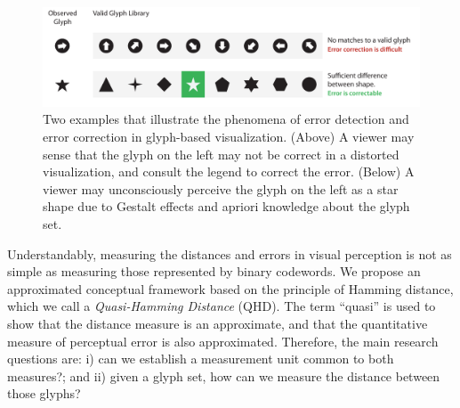 \begin{figure}[t!]
\begin{center}
\includegraphics[width=\textwidth]{images/filesystem/latest/QHD}
\end{center}
\caption{Two examples that illustrate the phenomena of error detection and error correction in glyph-based visualization. (Above) A viewer may sense that the glyph on the left may not be correct in a distorted visualization, and consult the legend to correct the error. (Below) A viewer may unconsciously perceive the glyph on the left as a star shape due to Gestalt effects and apriori knowledge about the glyph set.}
\label{fig:glyph_hamming}
\end{figure}


Understandably, measuring the distances and errors in visual perception is not as simple as measuring those represented by binary codewords.
We propose an approximated conceptual framework based on the principle of Hamming distance, which we call a \emph{Quasi-Hamming Distance} (QHD).
The term ``quasi'' is used to show that the distance measure is an approximate, and that the quantitative measure of perceptual error is also approximated.
Therefore, the main research questions are:
i) can we establish a measurement unit common to both measures?; and
ii) given a glyph set, how can we measure the distance between those glyphs?\\

